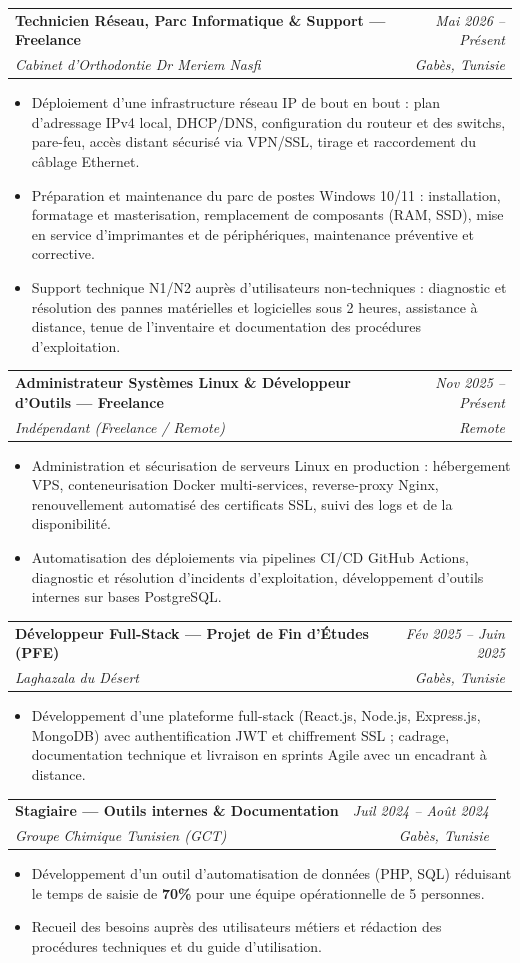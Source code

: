 \documentclass[letterpaper,9pt]{article}
\makeatletter
\newcommand{\resumeItem}[1]{\item\small{#1}}
\newcommand{\resumeSubheading}[4]{
  \vspace{-1pt}\item
  \begin{tabular*}{0.97\textwidth}[t]{l@{\extracolsep{\fill}}r}
    \textbf{#1} & \textit{\color{greytext}#2} \\
    \textit{\small\color{greytext} #3} & \textit{\small\color{greytext} #4}
  \end{tabular*}\vspace{-2pt}
}
\newcommand{\resumeItemListStart}{\begin{itemize}[leftmargin=0.24in, label={}, itemsep=0.9pt, topsep=1.2pt, parsep=0pt]}
\newcommand{\resumeItemListEnd}{\end{itemize}\vspace{-2pt}}
\makeatother
\begin{document}
  \resumeSubheading{Technicien Réseau, Parc Informatique \& Support --- Freelance}{Mai 2026 -- Présent}{Cabinet d'Orthodontie Dr Meriem Nasfi}{Gabès, Tunisie}
    \resumeItemListStart
      \resumeItem{Déploiement d'une infrastructure réseau IP de bout en bout : plan d'adressage IPv4 local, DHCP/DNS, configuration du routeur et des switchs, pare-feu, accès distant sécurisé via VPN/SSL, tirage et raccordement du câblage Ethernet.}
      \resumeItem{Préparation et maintenance du parc de postes Windows 10/11 : installation, formatage et masterisation, remplacement de composants (RAM, SSD), mise en service d'imprimantes et de périphériques, maintenance préventive et corrective.}
      \resumeItem{Support technique N1/N2 auprès d'utilisateurs non-techniques : diagnostic et résolution des pannes matérielles et logicielles sous 2 heures, assistance à distance, tenue de l'inventaire et documentation des procédures d'exploitation.}
    \resumeItemListEnd

  \resumeSubheading{Administrateur Systèmes Linux \& Développeur d'Outils --- Freelance}{Nov 2025 -- Présent}{Indépendant (Freelance / Remote)}{Remote}
    \resumeItemListStart
      \resumeItem{Administration et sécurisation de serveurs Linux en production : hébergement VPS, conteneurisation Docker multi-services, reverse-proxy Nginx, renouvellement automatisé des certificats SSL, suivi des logs et de la disponibilité.}
      \resumeItem{Automatisation des déploiements via pipelines CI/CD GitHub Actions, diagnostic et résolution d'incidents d'exploitation, développement d'outils internes sur bases PostgreSQL.}
    \resumeItemListEnd

  \resumeSubheading{Développeur Full-Stack --- Projet de Fin d'Études (PFE)}{Fév 2025 -- Juin 2025}{Laghazala du Désert}{Gabès, Tunisie}
    \resumeItemListStart
      \resumeItem{Développement d'une plateforme full-stack (React.js, Node.js, Express.js, MongoDB) avec authentification JWT et chiffrement SSL ; cadrage, documentation technique et livraison en sprints Agile avec un encadrant à distance.}
    \resumeItemListEnd

  \resumeSubheading{Stagiaire --- Outils internes \& Documentation}{Juil 2024 -- Août 2024}{Groupe Chimique Tunisien (GCT)}{Gabès, Tunisie}
    \resumeItemListStart
      \resumeItem{Développement d'un outil d'automatisation de données (PHP, SQL) réduisant le temps de saisie de \textbf{70\%} pour une équipe opérationnelle de 5 personnes.}
      \resumeItem{Recueil des besoins auprès des utilisateurs métiers et rédaction des procédures techniques et du guide d'utilisation.}
    \resumeItemListEnd
\end{document}
